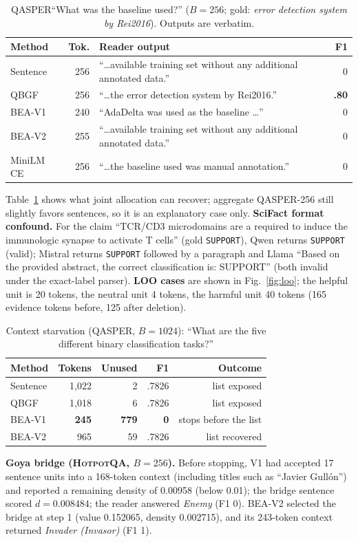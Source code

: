 \documentclass[10pt,twocolumn,letterpaper]{article}
\newcommand{\qbgf}{\textsc{QBGF}\xspace}
\newcommand{\vone}{\textsc{BEA-V1}\xspace}
\newcommand{\vtwo}{\textsc{BEA-V2}\xspace}
\newcommand{\hotpot}{\textsc{HotpotQA}\xspace}
\newcommand{\qasper}{\textsc{QASPER}\xspace}
\begin{document}
\begin{table}[H]\centering\footnotesize\setlength{\tabcolsep}{2.8pt}
\caption{\qasper ``What was the baseline used?'' ($B{=}256$; gold: \emph{error detection system by Rei2016}). Outputs are verbatim.}\label{tab:rei}
\begin{tabularx}{\columnwidth}{@{}lrXr@{}}\toprule
Method & Tok. & Reader output & F1\\\midrule
Sentence & 256 & ``\ldots available training set without any additional annotated data.'' & 0\\
\qbgf & 256 & ``\ldots the error detection system by Rei2016.'' & \textbf{.80}\\
\vone & 240 & ``AdaDelta was used as the baseline \ldots'' & 0\\
\vtwo & 255 & ``\ldots available training set without any additional annotated data.'' & 0\\
MiniLM CE & 256 & ``\ldots the baseline used was manual annotation.'' & 0\\\bottomrule
\end{tabularx}\end{table}
Table~\ref{tab:rei} shows what joint allocation can recover; aggregate \qasper-256 still slightly favors sentences, so it is an explanatory case only. \textbf{SciFact format confound.} For the claim ``TCR/CD3 microdomains are a required to induce the immunologic synapse to activate T cells'' (gold \texttt{SUPPORT}), Qwen returns \texttt{SUPPORT} (valid); Mistral returns \texttt{SUPPORT} followed by a paragraph and Llama ``Based on the provided abstract, the correct classification is: SUPPORT'' (both invalid under the exact-label parser). \textbf{LOO cases} are shown in Fig.~\ref{fig:loo}; the helpful unit is 20 tokens, the neutral unit 4 tokens, the harmful unit 40 tokens (165 evidence tokens before, 125 after deletion).

\begin{table}[H]\centering\small\setlength{\tabcolsep}{5pt}
\caption{Context starvation (\qasper, $B{=}1024$): ``What are the five different binary classification tasks?''}\label{tab:starve}
\begin{tabular}{lrrrr}\toprule
Method & Tokens & Unused & F1 & Outcome\\\midrule
Sentence & 1,022 & 2 & .7826 & list exposed\\
\qbgf & 1,018 & 6 & .7826 & list exposed\\
\vone & \textbf{245} & \textbf{779} & \textbf{0} & stops before the list\\
\vtwo & 965 & 59 & .7826 & list recovered\\\bottomrule
\end{tabular}\end{table}
\textbf{Goya bridge (\hotpot, $B{=}256$).} Before stopping, V1 had accepted 17 sentence units into a 168-token context (including titles such as ``Javier Gull\'on'') and reported a remaining density of 0.00958 (below 0.01); the bridge sentence scored $d{=}0.008484$; the reader answered \emph{Enemy} (F1 0). \vtwo selected the bridge at step 1 (value 0.152065, density 0.002715), and its 243-token context returned \emph{Invader (Invasor)} (F1 1).
\end{document}
